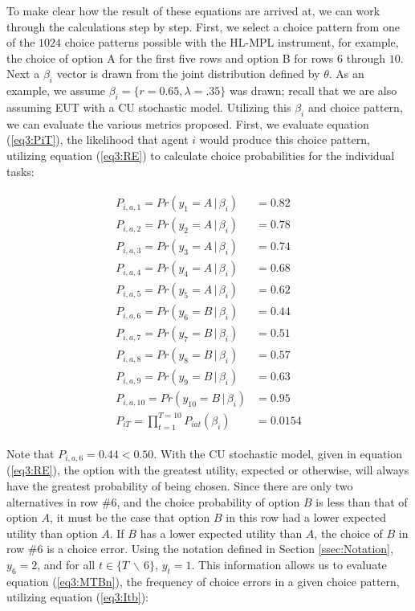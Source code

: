\documentclass[../main.tex]{subfiles}
\begin{document}
To make clear how the result of these equations are arrived at, we can work through the calculations step by step.
First, we select a choice pattern from one of the $1024$ choice patterns possible with the HL-MPL instrument, for example, the choice of option A for the first five rows and option B for rows $6$ through $10$.
Next a $\beta_i$ vector is drawn from the joint distribution defined by $\theta$.
As an example, we assume $\beta_i = \lbrace r = 0.65, \lambda = .35\rbrace$ was drawn; recall that we are also assuming EUT with a CU stochastic model.
Utilizing this $\beta_i$ and choice pattern, we can evaluate the various metrics proposed.
First, we evaluate equation (\ref{eq3:PiT}), the likelihood that agent $i$ would produce this choice pattern, utilizing equation (\ref{eq3:RE}) to calculate choice probabilities for the individual tasks:

\begin{align}
	\label{eq3:example_PiT}
	\begin{split}
		P_{i,a,1}  = Pr(y_1 = A    \,|\, \beta_i)    &= 0.82 \\
		P_{i,a,2}  = Pr(y_2 = A    \,|\, \beta_i)    &= 0.78 \\
		P_{i,a,3}  = Pr(y_3 = A    \,|\, \beta_i)    &= 0.74 \\
		P_{i,a,4}  = Pr(y_4 = A    \,|\, \beta_i)    &= 0.68 \\
		P_{i,a,5}  = Pr(y_5 = A    \,|\, \beta_i)    &= 0.62 \\
		P_{i,a,6}  = Pr(y_6 = B    \,|\, \beta_i)    &= 0.44 \\
		P_{i,a,7}  = Pr(y_7 = B    \,|\, \beta_i)    &= 0.51 \\
		P_{i,a,8}  = Pr(y_8 = B    \,|\, \beta_i)    &= 0.57 \\
		P_{i,a,9}  = Pr(y_9 = B    \,|\, \beta_i)    &= 0.63 \\
		P_{i,a,10} = Pr(y_{10} = B \,|\, \beta_i)    &= 0.95 \\
		P_{iT}     = \prod_{t = 1}^{T = 10} P_{iat}(\beta_i)  &= 0.0154
	\end{split}
\end{align}

\noindent Note that $P_{i,a,6} = 0.44 < 0.50$.
With the CU stochastic model, given in equation (\ref{eq3:RE}), the option with the greatest utility, expected or otherwise, will always have the greatest probability of being chosen.
Since there are only two alternatives in row \#6, and the choice probability of option $B$ is less than that of option $A$, it must be the case that option $B$ in this row had a lower expected utility than option $A$.
If $B$ has a lower expected utility than $A$, the choice of $B$ in row \#6 is a choice error.
Using the notation defined in Section \ref{ssec:Notation}, $y_6 = 2$, and for all $t \in \lbrace T \,\backslash\, 6 \rbrace$, $y_t = 1$.
This information allows us to evaluate equation (\ref{eq3:MTBn}), the frequency of choice errors in a given choice pattern, utilizing equation (\ref{eq3:Itb}):
\end{document}

